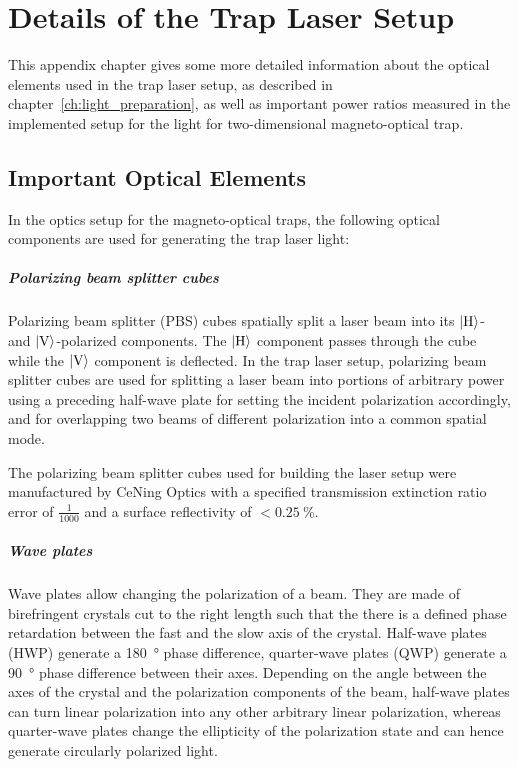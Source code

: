 \renewcommand{\imagepath}{../90-appendix/img}
\appendix

\chapter{Details of the Trap Laser Setup}
This appendix chapter gives some more detailed information about the optical elements used in the trap laser setup, as described in chapter~\ref{ch:light_preparation}, as well as important power ratios measured in the implemented setup for the light for two-dimensional magneto-optical trap.

\section{Important Optical Elements}\label{ch:optical_components}
In the optics setup for the magneto-optical traps, the following optical components are used for generating the trap laser light:

\paragraph{Polarizing beam splitter cubes} Polarizing beam splitter (PBS) cubes spatially split a laser beam into its $\Ket{\text{H}}$- and $\Ket{\text{V}}$-polarized components. The $\Ket{\text{H}}$ component passes through the cube while the $\Ket{\text{V}}$ component is deflected. In the trap laser setup, polarizing beam splitter cubes are used for splitting a laser beam into portions of arbitrary power using a preceding half-wave plate for setting the incident polarization accordingly, and for overlapping two beams of different polarization into a common spatial mode.

The polarizing beam splitter cubes used for building the laser setup were manufactured by CeNing Optics with a specified transmission extinction ratio error of $\frac{1}{1000}$ and a surface reflectivity of $<\SI{0.25}{\percent}$.
    
\paragraph*{Wave plates} Wave plates allow changing the polarization of a beam. They are made of birefringent crystals cut to the right length such that the there is a defined phase retardation between the fast and the slow axis of the crystal. Half-wave plates (HWP) generate a \SI{180}{\degree} phase difference, quarter-wave plates (QWP) generate a \SI{90}{\degree} phase difference between their axes. Depending on the angle between the axes of the crystal and the polarization components of the beam, half-wave plates can turn linear polarization into any other arbitrary linear polarization, whereas quarter-wave plates change the ellipticity of the polarization state and can hence generate circularly polarized light.

